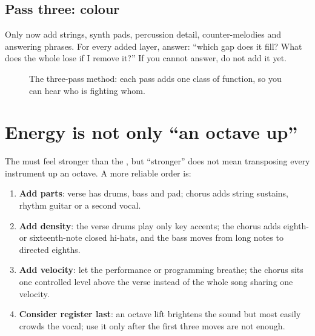 \subsection*{Pass three: colour}
Only now add strings, synth pads, percussion detail, counter-melodies and answering phrases. For every added layer, answer: ``which gap does it fill? What does the whole lose if I remove it?'' If you cannot answer, do not add it yet.

\begin{figure}[htbp]
  \centering
  \caption{The three-pass method: each pass adds one class of function, so you can hear who is fighting whom.}
  \label{fig:three-pass}
\end{figure}

\section{Energy is not only ``an octave up''}
\label{sec:energy}

The  must feel stronger than the , but ``stronger'' does not mean transposing every instrument up an octave. A more reliable order is:

\begin{enumerate}
\item \textbf{Add parts}: verse has drums, bass and pad; chorus adds string sustains, rhythm guitar or a second vocal.
\item \textbf{Add density}: the verse drums play only key accents; the chorus adds eighth- or sixteenth-note closed hi-hats, and the bass moves from long notes to directed eighths.
\item \textbf{Add velocity}: let the performance or programming breathe; the chorus sits one controlled level above the verse instead of the whole song sharing one velocity.
\item \textbf{Consider register last}: an octave lift brightens the sound but most easily crowds the vocal; use it only after the first three moves are not enough.
\end{enumerate}

